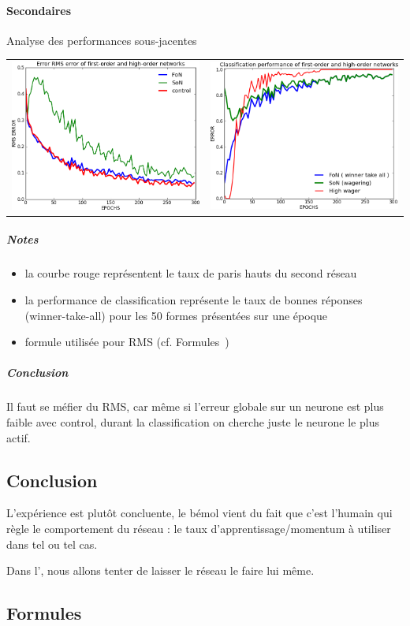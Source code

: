     \paragraph{Secondaires}
      Analyse des performances sous-jacentes
      \begin{center}
	\begin{tabular}{lr}
	  \hspace*{-1cm}
	  \includegraphics[width=250px]{data/expD3/rms.png}
	  &
	  \includegraphics[width=250px]{data/expD3/perf.png} 
	\end{tabular}
      \end{center} 
      \subparagraph{Notes}
	\begin{itemize}
	  \item la courbe rouge représentent le taux de paris hauts du second réseau
	  \item la performance de classification représente le taux de bonnes réponses (winner-take-all) pour les 50 formes présentées sur une époque
	  \item formule utilisée pour RMS (cf. Formules~)
	\end{itemize}
      \subparagraph{Conclusion}
	Il faut se méfier du RMS, car même si l'erreur globale sur un neurone est plus faible avec control, 
	durant la classification on cherche juste le neurone le plus actif.


  \subsection{Conclusion}
    L'expérience est plutôt concluente, le bémol vient du fait que c'est l'humain qui règle le comportement du réseau : le taux d'apprentissage/momentum
    à utiliser dans tel ou tel cas.
    
    Dans l', nous allons tenter de laisser le réseau le faire lui même.
  

  \newpage 
  \subsection{Formules}
    
    
    
    


